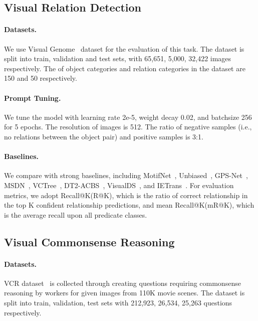 \documentclass[11pt]{article}
\begin{document}
\smallskip
\subsection{Visual Relation Detection} 
\paragraph{Datasets. } We use Visual Genome~\cite{krishna2017visual} dataset for the evaluation of this task. The dataset is split into train, validation and test sets, with 65,651, 5,000, 32,422 images respectively. The of object categories and relation categories in the dataset are 150 and 50 respectively.

\paragraph{Prompt Tuning. } We tune the model with learning rate 2e-5, weight decay 0.02, and batchsize 256 for 5 epochs. The resolution of images is 512. The ratio of negative samples (i.e., no relations between the object pair) and positive samples is 3:1.

\paragraph{Baselines.} We compare with strong baselines, including MotifNet~\cite{zellers2018neural}, Unbiased~\cite{tang2020unbiased}, GPS-Net~\cite{lin2020gps}, MSDN~\cite{xu2017scene}, VCTree~\cite{tang2019learning}, DT2-ACBS~\cite{desai2021dt2}, VisualDS~\cite{yao2021visual}, and IETrans~\cite{zhang2022fine}. For evaluation metrics, we adopt Recall@K(R@K), which is the ratio of correct relationship in the top K confident relationship predictions, and mean Recall@K(mR@K), which is the average recall upon all predicate classes.



\smallskip
\subsection{Visual Commonsense Reasoning} 
\paragraph{Datasets.} VCR dataset~\cite{zellers2019recognition} is collected through creating questions requiring commonsense reasoning by workers for given images from 110K movie scenes. The dataset is split into train, validation, test sets with 212,923, 26,534, 25,263 questions respectively.
\end{document}

